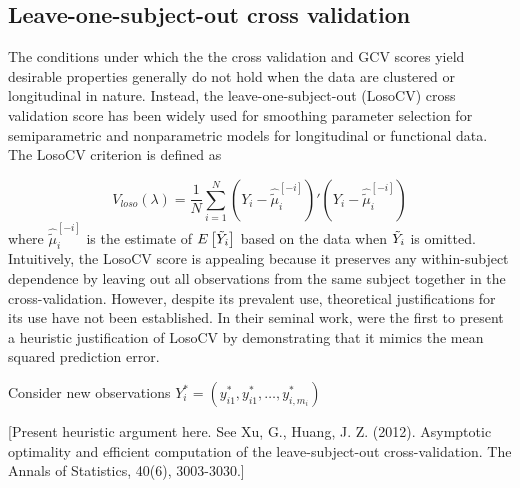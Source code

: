 \subsection{Leave-one-subject-out cross validation}  
The conditions under which the the cross validation and GCV scores yield desirable properties generally do not hold when the data are clustered or longitudinal in nature. Instead, the leave-one-subject-out (LosoCV) cross validation score has been widely used for smoothing parameter selection for semiparametric and nonparametric models for longitudinal or functional data. The LosoCV criterion is defined as

\begin{equation} \label{eq:LOSOCV}
V_{loso}\left(\lambda\right) = \frac{1}{N}\sum_{i=1}^N \left( Y_i - \widehat{\tilde{\mu}}^{\left[-i\right]}_{i}\right)'\left( Y_i -  \widehat{\tilde{\mu}}^{\left[-i\right]}_{i}\right)
\end{equation}
\noindent
where $\widehat{\tilde{\mu}}^{\left[-i\right]}_{i}$ is the estimate of $E\left[ \tilde{Y}_i \right]$ based on the data when $\tilde{Y}_i$ is omitted. Intuitively, the LosoCV score is appealing because it preserves any within-subject dependence by leaving out all observations from the same subject together in the cross-validation.  However, despite its prevalent use, theoretical justifications for its use have not been established. In their seminal work, \citet{rice1991estimating} were the first to present a heuristic justification of LosoCV by demonstrating that it mimics the mean squared prediction error.
\bigskip

Consider new observations $Y^*_i = \left(y_{i1}^*, y_{i1}^*, \dots, y_{i, m_i}^*\right)$  
\bigskip 

[Present heuristic argument here. See Xu, G.,  Huang, J. Z. (2012). Asymptotic optimality and efficient computation of the leave-subject-out cross-validation. The Annals of Statistics, 40(6), 3003-3030.] 

